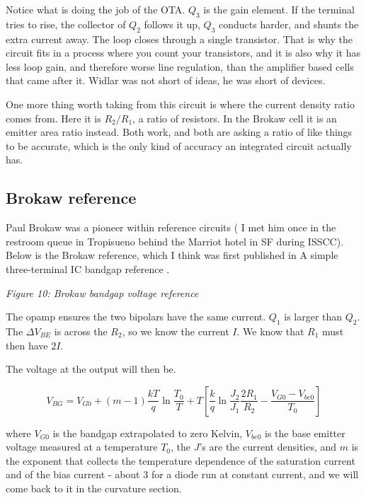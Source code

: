 Notice what is doing the job of the OTA. \(Q_3\) is the gain element. If
the terminal tries to rise, the collector of \(Q_2\) follows it up,
\(Q_3\) conducts harder, and shunts the extra current away. The loop
closes through a single transistor. That is why the circuit fits in a
process where you count your transistors, and it is also why it has less
loop gain, and therefore worse line regulation, than the amplifier based
cells that came after it. Widlar was not short of ideas, he was short of
devices.

One more thing worth taking from this circuit is where the current
density ratio comes from. Here it is \(R_2/R_1\), a ratio of resistors.
In the Brokaw cell it is an emitter area ratio instead. Both work, and
both are asking a ratio of like things to be accurate, which is the only
kind of accuracy an integrated circuit actually has.

\subsection{Brokaw reference}\label{brokaw-reference}

Paul Brokaw was a pioneer within reference circuits ( I met him once in
the restroom queue in Tropisueno behind the Marriot hotel in SF during
ISSCC). Below is the Brokaw reference, which I think was first published
in A simple three-terminal IC bandgap reference
.


{
\centering
{}
}

\emph{Figure 10: Brokaw bandgap voltage reference }

The opamp ensures the two bipolars have the same current. \(Q_1\) is
larger than \(Q_2\). The \(\Delta V_{BE}\) is across the \(R_2\), so we
know the current \(I\). We know that \(R_1\) must then have \(2I\).

The voltage at the output will then be.

\[ V_{BG} = V_{G0} + (m-1)\frac{kT}{q}\ln{\frac{T_0}{T}} +T\left[\frac{k}{q}\ln{\frac{J_2}{J_1}}\frac{2R_1}{R_2} - \frac{V_{G0}- V_{be0}}{T_0}\right] \]

where \(V_{G0}\) is the bandgap extrapolated to zero Kelvin, \(V_{be0}\)
is the base emitter voltage measured at a temperature \(T_0\), the
\(J\)'s are the current densities, and \(m\) is the exponent that
collects the temperature dependence of the saturation current and of the
bias current - about 3 for a diode run at constant current, and we will
come back to it in the curvature section.

